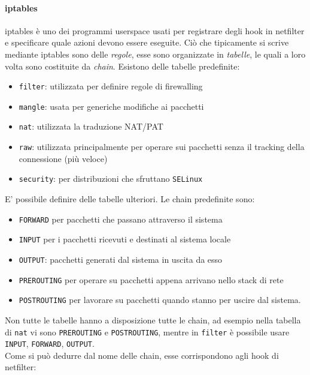 \paragraph{iptables}
iptables è uno dei programmi userspace usati per registrare degli hook in netfilter e
specificare quale azioni devono essere eseguite.  Ciò che tipicamente si scrive
mediante iptables sono delle \textit{regole}, esse sono organizzate in
\textit{tabelle}, le quali a loro volta sono costituite da \textit{chain}. Esistono delle
tabelle predefinite:
\begin{itemize}
  \item \texttt{filter}: utilizzata per definire regole di firewalling
  \item \texttt{mangle}: usata per generiche modifiche ai pacchetti
  \item \texttt{nat}: utilizzata la traduzione NAT/PAT
  \item \texttt{raw}: utilizzata principalmente per operare sui pacchetti senza
  il tracking della connessione (più veloce)
  \item \texttt{security}: per distribuzioni che sfruttano \texttt{SELinux}
\end{itemize}
E' possibile definire delle tabelle ulteriori.
Le chain predefinite sono:
\begin{itemize}
  \item \texttt{FORWARD} per pacchetti che passano attraverso
  il sistema
  \item \texttt{INPUT} per i pacchetti ricevuti e destinati al sistema locale
  \item \texttt{OUTPUT}: pacchetti generati dal sistema in uscita da esso
  \item \texttt{PREROUTING} per operare su pacchetti appena arrivano nello
  stack di rete
  \item \texttt{POSTROUTING} per lavorare su pacchetti quando stanno per uscire
  dal sistema.
\end{itemize}
Non tutte le tabelle hanno a disposizione tutte le chain, ad esempio nella tabella
di \texttt{nat} vi sono \texttt{PREROUTING} e \texttt{POSTROUTING}, mentre
in \texttt{filter} è possibile usare \texttt{INPUT}, \texttt{FORWARD}, \texttt{OUTPUT}.\\
Come si può dedurre dal nome delle chain, esse corrispondono agli hook di
netfilter:


